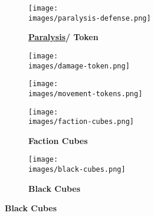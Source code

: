 \begin{figure}[H]
  \centering
  \begin{subfigure}[b]{0.2\linewidth}
    \caption{\textbf{}}
  \end{subfigure}
  \begin{subfigure}[b]{0.17\linewidth}
    \centering
    \texttt{[image: \\images/paralysis-defense.png]}
    \caption{\textbf{\hyperlink{Paralysis}{Paralysis}/  Token}}
  \end{subfigure}
  \begin{subfigure}[b]{0.1\linewidth}
    \centering
    \texttt{[image: \\images/damage-token.png]}
    \caption{\textbf{}}
  \end{subfigure}
  \begin{subfigure}[b]{0.15\linewidth}
    \centering
    \texttt{[image: \\images/movement-tokens.png]}
    \caption{\textbf{}}
  \end{subfigure}
  \begin{subfigure}[b]{0.15\linewidth}
    \centering
    \texttt{[image: \\images/faction-cubes.png]}
    \caption{\textbf{Faction Cubes}}
  \end{subfigure}
  \begin{subfigure}[b]{0.15\linewidth}
    \centering
    \texttt{[image: \\images/black-cubes.png]}
    \caption{\textbf{Black Cubes}}
  \end{subfigure}
\end{figure}
\vspace*{-2em}
